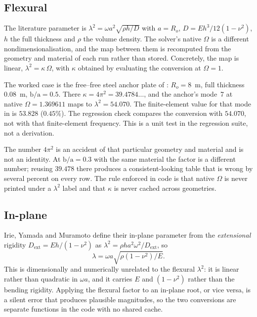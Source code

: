 \documentclass[11pt]{article}
\newcommand{\lamsq}{\lambda^{2}}
\newcommand{\ba}{\mbox{b/a}}
\begin{document}
\subsection{Flexural}\label{sec:sm-conv-flex}
The literature parameter is
$\lamsq=\omega a^{2}\sqrt{\rho h/D}$ with $a=R_o$, $D=Eh^{3}/12(1-\nu^{2})$,
$h$ the full thickness and $\rho$ the volume density. The solver's native $\Omega$ is a different
nondimensionalisation, and the map between them is recomputed from the
geometry and material of each run rather than stored. Concretely, the map is
linear, $\lamsq=\kappa\,\Omega$, with $\kappa$ obtained by evaluating the
conversion at $\Omega=1$.

The worked case is the free--free steel anchor plate of
\cite{mccune2026annular}: $R_o=8$~m, full thickness $0.08$~m, $\ba=0.5$. There
$\kappa=4\pi^{2}=39.4784\ldots$, and the anchor's mode~7 at native
$\Omega=1.369611$ maps to $\lamsq=54.070$. The finite-element value
for that mode in \cite{mccune2026annular} is $53.828$ ($0.45\%$).
The regression check compares the conversion with $54.070$, not with
that finite-element frequency. This is a unit test in the
regression suite, not a derivation.

The number $4\pi^{2}$ is an accident of that particular geometry and material
and is not an identity. At $\ba=0.3$ with the same material the factor is a
different number; reusing $39.478$ there produces a consistent-looking table
that is wrong by several percent on every row. The rule enforced in code is
that native $\Omega$ is never printed under a $\lamsq$ label and that $\kappa$
is never cached across geometries.

\subsection{In-plane}\label{sec:sm-conv-ip}
Irie, Yamada and Muramoto define their in-plane parameter from the
\emph{extensional} rigidity $D_{\mathrm{ext}}=Eh/(1-\nu^{2})$ as
$\lambda^{2}=\rho h a^{2}\omega^{2}/D_{\mathrm{ext}}$, so
\begin{equation}
\lambda=\omega a\sqrt{\rho(1-\nu^{2})/E}.
\label{eq:sm-irie}
\end{equation}
This is dimensionally and numerically unrelated to the flexural $\lamsq$: it
is linear rather than quadratic in $\omega a$, and it carries $E$ and
$(1-\nu^{2})$ rather than the bending rigidity. Applying the flexural factor
to an in-plane root, or vice versa, is a silent error that produces plausible
magnitudes, so the two conversions are separate functions in the code with no
shared cache.
\end{document}
